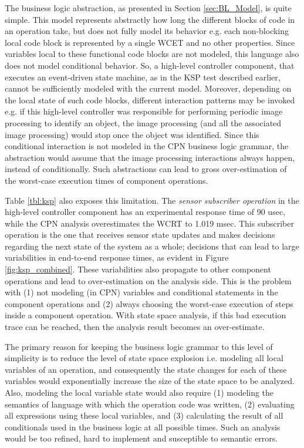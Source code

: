 The business logic abstraction, as presented in Section \ref{sec:BL_Model}, is quite simple. This model represents abstractly how long the different blocks of code in an operation take, but does not fully model its behavior e.g. each non-blocking local code block is represented by a single WCET and no other properties. Since variables local to these functional code blocks are not modeled, this language also does not model conditional behavior. So, a high-level controller component, that executes an event-driven state machine, as in the KSP test described earlier, cannot be sufficiently modeled with the current model. Moreover, depending on the local state of such code blocks, different interaction patterns may be invoked e.g. if this high-level controller was responsible for performing periodic image processing to identify an object, the image processing (and all the associated image processing) would stop once the object was identified. Since this conditional interaction is not modeled in the CPN business logic grammar, the abstraction would assume that the image processing interactions always happen, instead of conditionally. Such abstractions can lead to gross over-estimation of the worst-case execution times of component operations. 

Table \ref{tbl:ksp} also exposes this limitation. The \emph{sensor subscriber operation} in the high-level controller component has an experimental response time of 90 usec, while the CPN analysis overestimates the WCRT to 1.019 msec. This subscriber operation is the one that receives sensor state updates and makes decisions regarding the next state of the system as a whole; decisions that can lead to large variabilities in end-to-end response times, as evident in Figure \ref{fig:ksp_combined}. These variabilities also propagate to other component operations and lead to over-estimation on the analysis side. This is the problem with (1) not modeling (in CPN) variables and conditional statements in the component operations and (2) always choosing the worst-case execution of steps inside a component operation. With state space analysis, if this bad execution trace can be reached, then the analysis result becomes an over-estimate.

The primary reason for keeping the business logic grammar to this level of simplicity is to reduce the level of state space explosion i.e. modeling all local variables of an operation, and consequently the state changes for each of these variables would exponentially increase the size of the state space to be analyzed. Also, modeling the local variable state would also require (1) modeling the semantics of language with which the operation code was written, (2) evaluating all expressions using these local variables, and (3) calculating the result of all conditionals used in the business logic at all possible times. Such an analysis would be too refined, hard to implement and susceptible to semantic errors. 



